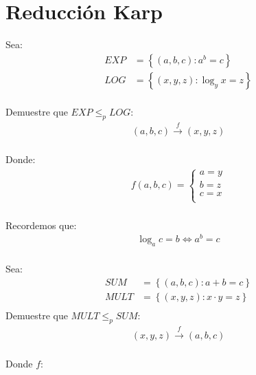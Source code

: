 \documentclass{templateNote}
\begin{document}
\newpage
\section*{Reducción Karp}
Sea: 
\begin{align*}
    EXP &= \left\{ \left( a,b,c \right) : a^b=c\right\} \\
    LOG &= \left\{ \left( x,y,z \right) : \log_y x = z\right\} \\
\end{align*}

Demuestre que $EXP \leq_p LOG$:
\begin{align*}
    \left(a,b,c\right) \overset{f}{\rightarrow} \left(x,y,z\right) \\
\end{align*}

Donde:
\begin{align*}
    f \left( a,b,c \right) = \begin{cases}
        a = y \\
        b = z \\
        c = x \\
    \end{cases} \\
\end{align*}

Recordemos que:
\begin{align*}
    \log_a c = b \Leftrightarrow a^b = c \\
\end{align*}

Sea:
\begin{align*}
    SUM &= \left\{\left(a,b,c\right):  a+b=c\right\} \\
    MULT &= \left\{\left(x,y,z\right):  x \cdot y=z\right\} \\
\end{align*}
Demuestre que $MULT \leq_p SUM$:
\begin{align*}
    \left(x,y,z\right) \overset{f}{\rightarrow} \left(a,b,c\right) \\
\end{align*}

Donde $f$:

\begin{algorithm*}[H]
\end{algorithm*}
\end{document}
